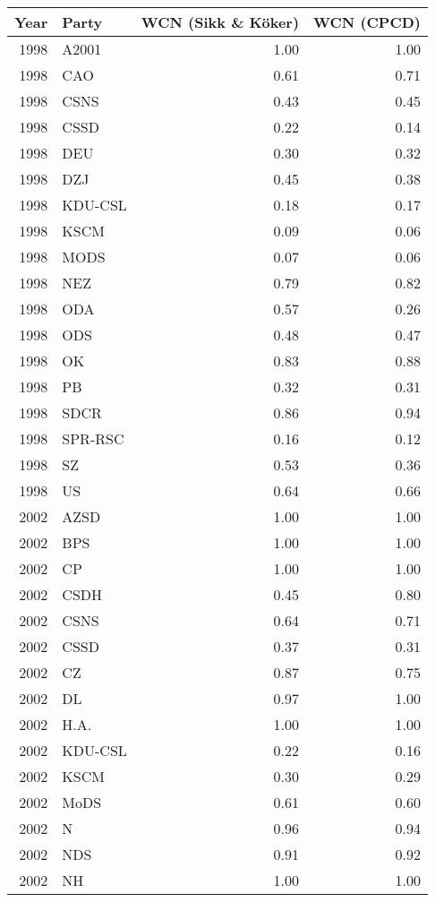 
\begin{tabular}{r|l|r|r}
\hline
Year & Party & WCN (Sikk \& Köker) & WCN (CPCD)\\
\hline
1998 & A2001 & 1.00 & 1.00\\
\hline
1998 & CAO & 0.61 & 0.71\\
\hline
1998 & CSNS & 0.43 & 0.45\\
\hline
1998 & CSSD & 0.22 & 0.14\\
\hline
1998 & DEU & 0.30 & 0.32\\
\hline
1998 & DZJ & 0.45 & 0.38\\
\hline
1998 & KDU-CSL & 0.18 & 0.17\\
\hline
1998 & KSCM & 0.09 & 0.06\\
\hline
1998 & MODS & 0.07 & 0.06\\
\hline
1998 & NEZ & 0.79 & 0.82\\
\hline
1998 & ODA & 0.57 & 0.26\\
\hline
1998 & ODS & 0.48 & 0.47\\
\hline
1998 & OK & 0.83 & 0.88\\
\hline
1998 & PB & 0.32 & 0.31\\
\hline
1998 & SDCR & 0.86 & 0.94\\
\hline
1998 & SPR-RSC & 0.16 & 0.12\\
\hline
1998 & SZ & 0.53 & 0.36\\
\hline
1998 & US & 0.64 & 0.66\\
\hline
2002 & AZSD & 1.00 & 1.00\\
\hline
2002 & BPS & 1.00 & 1.00\\
\hline
2002 & CP & 1.00 & 1.00\\
\hline
2002 & CSDH & 0.45 & 0.80\\
\hline
2002 & CSNS & 0.64 & 0.71\\
\hline
2002 & CSSD & 0.37 & 0.31\\
\hline
2002 & CZ & 0.87 & 0.75\\
\hline
2002 & DL & 0.97 & 1.00\\
\hline
2002 & H.A. & 1.00 & 1.00\\
\hline
2002 & KDU-CSL & 0.22 & 0.16\\
\hline
2002 & KSCM & 0.30 & 0.29\\
\hline
2002 & MoDS & 0.61 & 0.60\\
\hline
2002 & N & 0.96 & 0.94\\
\hline
2002 & NDS & 0.91 & 0.92\\
\hline
2002 & NH & 1.00 & 1.00\\

\end{tabular}
